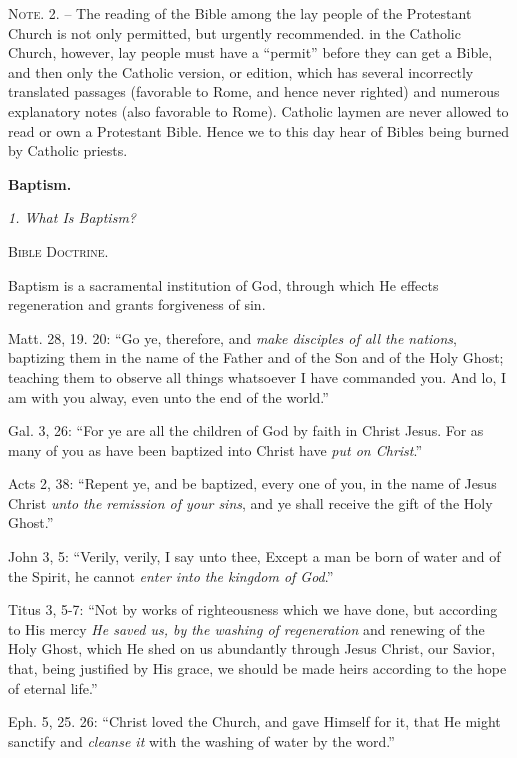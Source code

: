 \documentclass[
]{book}
\begin{document}
\textsc{Note. 2. --} The reading of the Bible among the lay people of the Protestant Church is not only permitted, but urgently recommended. in the Catholic Church, however, lay people must have a ``permit'' before they can get a Bible, and then only the Catholic version, or edition, which has several incorrectly translated passages (favorable to Rome, and hence never righted) and numerous explanatory notes (also favorable to Rome). Catholic laymen are never allowed to read or own a Protestant Bible. Hence we to this day hear of Bibles being burned by Catholic priests.

\begin{center}
\textbf{Baptism.}

\textsl{1.  What Is Baptism?}

\textsc{Bible Doctrine.}
\end{center}

Baptism is a sacramental institution of God, through which He effects regeneration and grants forgiveness of sin.

Matt. 28, 19. 20: ``Go ye, therefore, and \emph{make disciples of all the nations}, baptizing them in the name of the Father and of the Son and of the Holy Ghost; teaching them to observe all things whatsoever I have commanded you. And lo, I am with you alway, even unto the end of the world.''

Gal. 3, 26: ``For ye are all the children of God by faith in Christ Jesus. For as many of you as have been baptized into Christ have \emph{put on Christ}.''

Acts 2, 38: ``Repent ye, and be baptized, every one of you, in the name of Jesus Christ \emph{unto the remission of your sins}, and ye shall receive the gift of the Holy Ghost.''

John 3, 5: ``Verily, verily, I say unto thee, Except a man be born of water and of the Spirit, he cannot \emph{enter into the kingdom of God}.''

Titus 3, 5-7: ``Not by works of righteousness which we have done, but according to His mercy \emph{He saved us, by the washing of regeneration} and renewing of the Holy Ghost, which He shed on us abundantly through Jesus Christ, our Savior, that, being justified by His grace, we should be made heirs according to the hope of eternal life.''

Eph. 5, 25. 26: ``Christ loved the Church, and gave Himself for it, that He might sanctify and \emph{cleanse it} with the washing of water by the word.''
\end{document}
